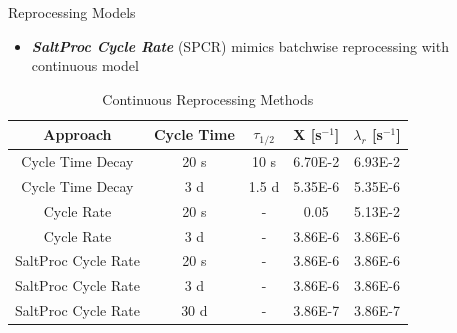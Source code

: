 \documentclass[final]{beamer}
\newlength{\onecolwid}
\newlength{\threecolwid}
\begin{document}
\begin{frame}[t]
\begin{columns}[t,totalwidth=\threecolwid]
\begin{column}{\onecolwid}
\begin{block}{Reprocessing Models}
\begin{itemize}
	\item \textbf{\emph{SaltProc Cycle Rate}} (SPCR) mimics batchwise reprocessing with continuous model
\end{itemize}


\begin{table}[H]
\renewcommand{\arraystretch}{1.25}
\caption{Continuous Reprocessing Methods}
\label{tab:cont_methods}
\begin{center}
\begin{tabular}{ | c | c | c | c | c | }
 \hline
	Approach & Cycle Time & $\tau_{1/2}$ & X [s$^{-1}$] & $\lambda_{r}$ [s$^{-1}$]\\
 \hline
 \hline
 Cycle Time Decay & 20 s & 10 s & 6.70E-2 & 6.93E-2\\
 Cycle Time Decay & 3 d & 1.5 d & 5.35E-6 & 5.35E-6\\
 Cycle Rate & 20 s & - & 0.05 & 5.13E-2\\
 Cycle Rate & 3 d & - & 3.86E-6 & 3.86E-6\\
 SaltProc Cycle Rate & 20 s & - & 3.86E-6 & 3.86E-6\\
 SaltProc Cycle Rate & 3 d & - & 3.86E-6 & 3.86E-6\\
 SaltProc Cycle Rate & 30 d & - & 3.86E-7 & 3.86E-7\\
 
 \hline
\end{tabular}
\end{center}
\end{table}




\end{block}
\end{column}
\end{columns}
\end{frame}
\end{document}

